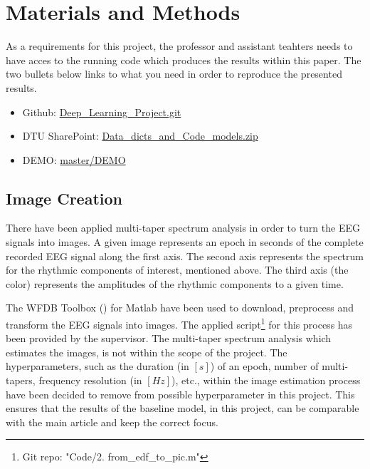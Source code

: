 \section{Materials and Methods}
\label{sec:materials_and_methods}

 As a requirements for this project, the professor and assistant teahters needs to have acces to the running code which produces the results within this paper. The two bullets below links to what you need in order to reproduce the presented results.
 \begin{itemize}
 	\item Github: \href{https://github.com/anderslaunerbaek/Deep\_Learning\_Project.git}{Deep\_Learning\_Project.git}
 	\item DTU SharePoint: \href{https://dtudk-my.sharepoint.com/personal/s160159\_win\_dtu\_dk/\_layouts/15/guestaccess.aspx?docid=093aa4dcaee0b4e3aa18b0ee67061a678&authkey=AbdnyuYwQUWn0BDEPeDn1Mg&e=b79a063cd72d43a9b7db88f8b8fd1b06}{Data\_dicts\_and\_Code\_models.zip}
 	\item DEMO: \href{https://github.com/anderslaunerbaek/Deep_Learning_Project/tree/master/DEMO}{master/DEMO}
 \end{itemize}

\subsection{Image Creation}
There have been applied multi-taper spectrum analysis in order to turn the EEG signals into images. A given image represents an epoch in seconds of the complete recorded EEG signal along the first axis. The second axis represents the spectrum for the rhythmic components of interest, mentioned above. The third axis (the color) represents the amplitudes of the rhythmic components to a given time. 

The WFDB Toolbox (\cite{matlab}) for Matlab have been used to download, preprocess and transform the EEG signals into images. The applied script\footnote{Git repo: "Code/2. from\_edf\_to\_pic.m"} for this process has been provided by the supervisor. 
The multi-taper spectrum analysis which estimates the images, is not within the scope of the project. The hyperparameters, such as the duration (in $\left[s \right]$) of an epoch, number of multi-tapers, frequency resolution (in $\left[Hz \right]$), etc., within the image estimation process have been decided to remove from possible hyperparameter in this project. This ensures that the results of the baseline model, in this project, can be comparable with the main article \cite{main_ar} and keep the correct focus. 

